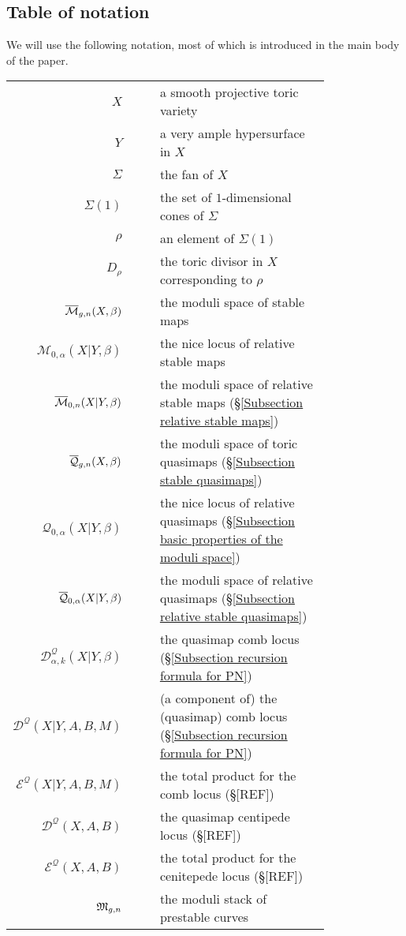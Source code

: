 \subsection{Table of notation} We will use the following notation, most of which is introduced in the main body of the paper.
\begin{longtabu}{r c | c p{0.8\linewidth}}
$X$ & & & a smooth projective toric variety \\
$Y$ & & & a very ample hypersurface in $X$ \\
$\Sigma$ & & & the fan of $X$ \\
$\Sigma(1)$ & & & the set of $1$-dimensional cones of $\Sigma$ \\
$\rho$ & & & an element of $\Sigma(1)$ \\
$D_\rho$ & & & the toric divisor in $X$ corresponding to $\rho$ \\
$\overline{\mathcal M}_{g,n}(X,\beta)$ & & & the moduli space of stable maps \\
$\mathcal{M}_{0,\alpha}(X|Y,\beta)$ & & & the nice locus of relative stable maps \\
$\overline{\mathcal M}_{0,n}(X|Y,\beta)$ & & & the moduli space of relative stable maps (\S \ref{Subsection relative stable maps}) \\
$\overline{\mathcal Q}_{g,n}(X,\beta)$ & & & the moduli space of toric quasimaps (\S \ref{Subsection stable quasimaps}) \\
$\mathcal{Q}_{0,\alpha}(X|Y,\beta)$ & & & the nice locus of relative quasimaps (\S \ref{Subsection basic properties of the moduli space}) \\
$\overline{\mathcal Q}_{0,\alpha}(X|Y,\beta)$ & & & the moduli space of relative quasimaps (\S \ref{Subsection relative stable quasimaps}) \\
$\mathcal{D}^{\mathcal{Q}}_{\alpha,k}(X|Y,\beta)$ & & & the quasimap comb locus (\S \ref{Subsection recursion formula for PN}) \\
$\mathcal{D}^{\mathcal{Q}}(X|Y,A,B,M)$ & & & (a component of) the (quasimap) comb locus (\S \ref{Subsection recursion formula for PN}) \\
$\mathcal{E}^{\mathcal{Q}}(X|Y,A,B,M)$ & & & the total product for the comb locus (\S [REF]) \\
$\mathcal{D}^{\mathcal{Q}}(X,A,B)$ & & & the quasimap centipede locus (\S [REF])  \\
$\mathcal{E}^{\mathcal{Q}}(X,A,B)$ & & & the total product for the cenitepede locus (\S [REF]) \\
$\mathfrak M_{g,n}$ & & & the moduli stack of prestable curves \\

\end{longtabu}
